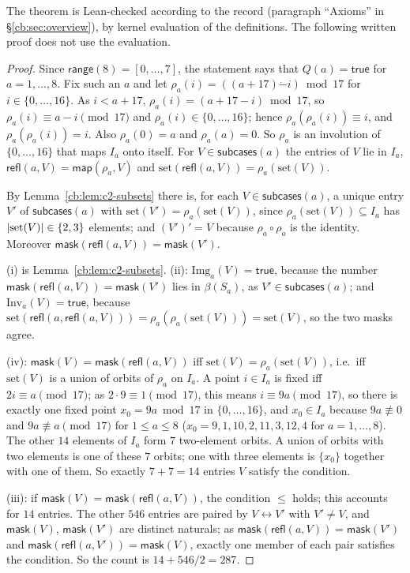 The theorem is Lean-checked according to the record (paragraph ``Axioms'' in \S\ref{cb:sec:overview}), by kernel
evaluation of the definitions. The following written proof does not use the
evaluation.

\begin{proof}
Since $\mathsf{range}(8)=[0,\dots,7]$, the statement says that $Q(a)=\mathsf{true}$ for $a=1,\dots,8$. Fix such an
$a$ and let $\rho_a(i)=((a+17)\mathbin{\dot-}i)\bmod17$ for $i\in\{0,\dots,16\}$. As $i<a+17$,
$\rho_a(i)=(a+17-i)\bmod17$, so $\rho_a(i)\equiv a-i\pmod{17}$ and $\rho_a(i)\in\{0,\dots,16\}$; hence
$\rho_a(\rho_a(i))\equiv i$, and $\rho_a(\rho_a(i))=i$. Also $\rho_a(0)=a$ and $\rho_a(a)=0$. So $\rho_a$ is an
involution of $\{0,\dots,16\}$ that maps $I_a$ onto itself. For $V\in\mathsf{subcases}(a)$ the entries of $V$ lie in
$I_a$, $\mathsf{refl}(a,V)=\mathsf{map}(\rho_a,V)$ and $\mathrm{set}(\mathsf{refl}(a,V))=\rho_a(\mathrm{set}(V))$.

By Lemma~\ref{cb:lem:c2-subsets} there is, for each $V\in\mathsf{subcases}(a)$, a unique entry $V'$ of
$\mathsf{subcases}(a)$ with $\mathrm{set}(V')=\rho_a(\mathrm{set}(V))$, since $\rho_a(\mathrm{set}(V))\subseteq I_a$
has $\lvert\mathrm{set}(V)\rvert\in\{2,3\}$ elements; and $(V')'=V$ because $\rho_a\circ\rho_a$ is the identity. Moreover
$\mathsf{mask}(\mathsf{refl}(a,V))=\mathsf{mask}(V')$.

(i) is Lemma~\ref{cb:lem:c2-subsets}. (ii): $\mathrm{Img}_a(V)=\mathsf{true}$, because the number
$\mathsf{mask}(\mathsf{refl}(a,V))=\mathsf{mask}(V')$ lies in $\beta(S_a)$, as $V'\in\mathsf{subcases}(a)$; and
$\mathrm{Inv}_a(V)=\mathsf{true}$, because
$\mathrm{set}(\mathsf{refl}(a,\mathsf{refl}(a,V)))=\rho_a(\rho_a(\mathrm{set}(V)))=\mathrm{set}(V)$, so the two masks
agree.

(iv): $\mathsf{mask}(V)=\mathsf{mask}(\mathsf{refl}(a,V))$ iff $\mathrm{set}(V)=\rho_a(\mathrm{set}(V))$, i.e.\ iff
$\mathrm{set}(V)$ is a union of orbits of $\rho_a$ on $I_a$. A point $i\in I_a$ is fixed iff $2i\equiv a\pmod{17}$; as
$2\cdot9\equiv1\pmod{17}$, this means $i\equiv9a\pmod{17}$, so there is exactly one fixed point $x_0=9a\bmod17$ in
$\{0,\dots,16\}$, and $x_0\in I_a$ because $9a\not\equiv0$ and $9a\not\equiv a\pmod{17}$ for $1\le a\le8$ ($x_0=9,1,10,
2,11,3,12,4$ for $a=1,\dots,8$). The other $14$ elements of $I_a$ form $7$ two-element orbits. A union of orbits with
two elements is one of these $7$ orbits; one with three elements is $\{x_0\}$ together with one of them. So exactly
$7+7=14$ entries $V$ satisfy the condition.

(iii): if $\mathsf{mask}(V)=\mathsf{mask}(\mathsf{refl}(a,V))$, the condition $\le$ holds; this accounts for $14$
entries. The other $546$ entries are paired by $V\leftrightarrow V'$ with $V'\ne V$, and $\mathsf{mask}(V)$,
$\mathsf{mask}(V')$ are distinct naturals; as $\mathsf{mask}(\mathsf{refl}(a,V))=\mathsf{mask}(V')$ and
$\mathsf{mask}(\mathsf{refl}(a,V'))=\mathsf{mask}(V)$, exactly one member of each pair satisfies the condition. So the
count is $14+546/2=287$.
\end{proof}

